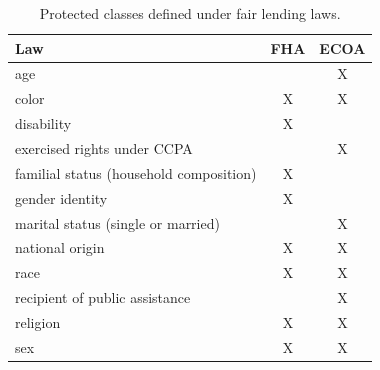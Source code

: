 \begin{table}[h]

\caption{\label{table:classes} Protected classes defined under fair lending laws.}

\begin{tabular}{l c c}
\toprule
Law & FHA\cite{fha}\! & ECOA\cite{ecoa}\! \\
\midrule
age & & X \\
color & X & X \\
disability & X & \\
exercised rights under CCPA & & X \\
familial status (household composition)\!\!& X & \\
gender identity & X & \\
marital status (single or married)& & X \\
national origin & X & X \\
race  & X & X \\
recipient of public assistance & & X \\
religion & X & X \\
sex & X & X \\
\bottomrule
\end{tabular}

\end{table}


